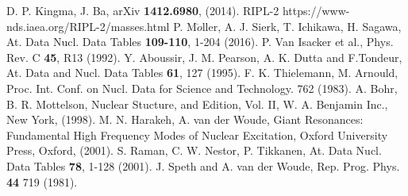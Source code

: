 \documentclass[twocolumn,showpacs,superscriptaddress,amsmath,amssymb,prc,preprintnumbers]{revtex4-1}
\begin{document}
\begin{thebibliography}{99}
 D. P. Kingma, J. Ba, arXiv \textbf{1412.6980}, (2014).
 RIPL-2 https://www-nds.iaea.org/RIPL-2/masses.html
 P. M$\ddot{o}$ller, A. J. Sierk, T. Ichikawa, H. Sagawa, At. Data Nucl. Data Tables \textbf{109-110}, 1-204 (2016).
 P. Van Isacker et al., Phys. Rev. C \textbf{45}, R13 (1992).
 Y. Aboussir, J. M. Pearson, A. K. Dutta and F.Tondeur, At. Data and Nucl. Data Tables \textbf{61}, 127 (1995).
 F. K. Thielemann, M. Arnould, Proc. Int. Conf. on Nucl. Data for Science and Technology. 762 (1983).
 A. Bohr, B. R. Mottelson, Nuclear Stucture, and Edition, Vol. II, W. A. Benjamin Inc., New York, (1998).
 M. N. Harakeh, A. van der Woude, Giant Resonances: Fundamental High Frequency Modes of Nuclear Excitation, Oxford University Press, Oxford, (2001).
 S. Raman, C. W. Nestor, P. Tikkanen, At. Data Nucl. Data Tables \textbf{78}, 1-128 (2001).
 J. Speth and A. van der Woude, Rep. Prog. Phys. \textbf{44} 719 (1981).
\end{thebibliography}
\end{document}
